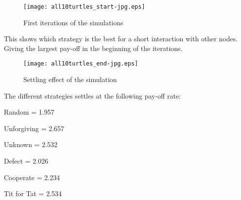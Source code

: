 \begin{figure}[!h]
  \centering
  \texttt{[image: all10turtles\_start-jpg.eps]}
  \caption{First iterations of the simulations}
  \label{fig:all10turtles_start-jpg}
\end{figure}
This shows which strategy is the best for a short interaction with other nodes. Giving the largest pay-off in the beginning of the iterations. 

\begin{figure}[!h]
  \centering
  \texttt{[image: all10turtles\_end-jpg.eps]}
  \caption{Settling effect of the simulation}
  \label{fig:all10turtles_end-jpg}
\end{figure}
\FloatBarrier

The different strategies settles at the following pay-off rate:
\begin{pitemize}
	\item Random = 1.957
	\item Unforgiving = 2.657
	\item Unknown = 2.532
	\item Defect = 2.026
	\item Cooperate = 2.234
	\item Tit for Tat = 2.534
\end{pitemize}

